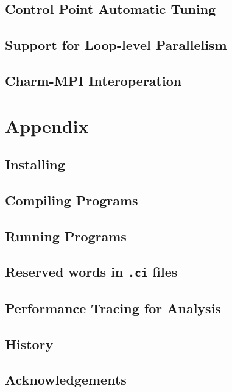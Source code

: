 \documentclass[10pt]{report}
\begin{document}
\chapter{Control Point Automatic Tuning}
\label{sec:controlpoint}
  

\chapter{Support for Loop-level Parallelism}
\label{sec:ckloop}


\chapter{Charm-MPI Interoperation}
\label{sec:interop}
  

\part{Appendix}
\appendix

%

\chapter{Installing \charm}
\label{sec:install}
  

\chapter{Compiling \charm Programs}
\label{sec:compile}
  

\chapter{Running \charm Programs}
\label{sec:run}
  

\chapter{Reserved words in {\tt .ci} files}
\label{sec:keywords}
  

\chapter{Performance Tracing for Analysis}
\label{sec:trace-projections}
  


\chapter{History}
  

\chapter {Acknowledgements}
  


\end{document}
